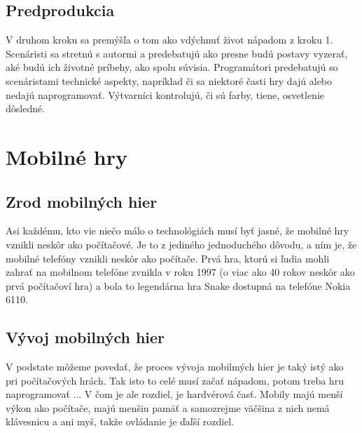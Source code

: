 \documentclass[10pt,twoside,slovak,a4paper]{article}
\begin{document}
\subsection{Predprodukcia}
V druhom kroku sa premýšľa o tom ako vdýchnuť život nápadom z kroku 1. Scenáristi sa stretnú s autormi a predebatujú ako presne budú postavy vyzerať, aké budú ich životné príbehy, ako spolu súvisia. Programátori predebatujú so scenáristami technické aspekty, napríklad či sa niektoré časti hry dajú alebo nedajú naprogramovať. Výtvarníci kontrolujú, či sú farby, tiene, osvetlenie dôsledné. 







\section{Mobilné hry} \label{mobilne}

\subsection{Zrod mobilných hier}

Asi každému, kto vie niečo málo o technológiách musí byť jasné, že mobilné hry vznikli neskôr ako počítačové. Je to z jediného jednoduchého dôvodu, a ním je, že mobilné telefóny vznikli neskôr ako počítače. Prvá hra, ktorú si ľudia mohli zahrať na mobilnom telefóne zvnikla v roku 1997 (o viac ako 40 rokov neskôr ako prvá počítačoví hra) a bola to legendárna hra Snake dostupná na telefóne Nokia 6110.~\cite{2}

\subsection{Vývoj mobilných hier}
V podstate môžeme povedať, že proces vývoja mobilmých hier je taký istý ako pri počítačových hrách. Tak isto to celé musí začať nápadom, potom treba hru naprogramovať ... V čom je ale rozdiel, je hardvérová časť. Mobily majú menší výkon ako počítače, majú menšiu pamäť a samozrejme väčšina z nich nemá klávesnicu a ani myš, takže ovládanie je ďaľší rozdiel.
\end{document}

